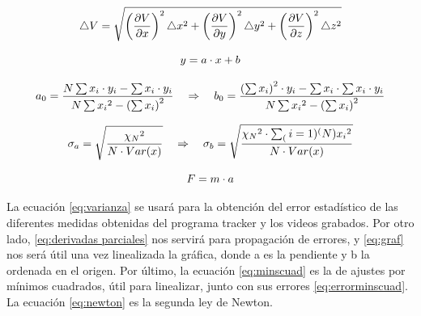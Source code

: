 \documentclass{article}
\begin{document}
\vspace{0.3cm}

\begin{equation}\label{eq:derivadas parciales}
    \centering
    \triangle{V} = \sqrt{\left(\frac{\partial{V}}{\partial{x}}\right)^2 \triangle{x}^2 + \left(\frac{\partial{V}}{\partial{y}}\right)^2 \triangle{y}^2 + \left(\frac{\partial{V}}{\partial{z}}\right)^2 \triangle{z}^2 }
\end{equation}

\vspace{0.3cm}

\begin{equation}\label{eq:graf}
    \centering
    y = a\cdot{x} + b
\end{equation}

\vspace{0.3cm}

\begin{equation}\label{eq:minscuad}
    \centering
    a_0 = \frac{N\sum x_i\cdot{y_i} - \sum x_i\cdot{y_i}}{N\sum {x_i}^2 - \left(\sum x_i \right)^2} \quad \Rightarrow \quad
    b_0 = \frac{\left(\sum x_i \right)^2\cdot{y_i} - \sum x_i\cdot\sum x_i\cdot{y_i}}{N\sum {x_i}^2 - \left(\sum x_i \right)^2}
\end{equation}

\vspace{0.3cm}

\begin{equation}\label{eq:errorminscuad}
    \centering
    \sigma_a = \sqrt{\frac{{\chi_N}^2}{N\cdot{Var(x)}}}
    \quad \Rightarrow \quad
    \sigma_b = \sqrt{\frac{{\chi_N}^2\cdot{\sum_(i=1)^(N) {x_i}^2}}{N\cdot{Var(x)}}}
\end{equation}

\vspace{0.3cm}

\begin{equation}\label{eq:newton}
    \centering
    F = m \cdot a
\end{equation}

\vspace{0.3cm}

La ecuación \eqref{eq:varianza} se usará para la obtención del error estadístico de las diferentes medidas obtenidas del programa tracker y los videos grabados. Por otro lado, \eqref{eq:derivadas parciales} nos servirá para propagación de errores, y \eqref{eq:graf} nos será útil una vez linealizada la gráfica, donde a es la pendiente y b la ordenada en el origen. Por último, la ecuación \eqref{eq:minscuad} es la de ajustes por mínimos cuadrados, útil para linealizar, junto con sus errores \eqref{eq:errorminscuad}. La ecuación \eqref{eq:newton} es la segunda ley de Newton.
\end{document}
